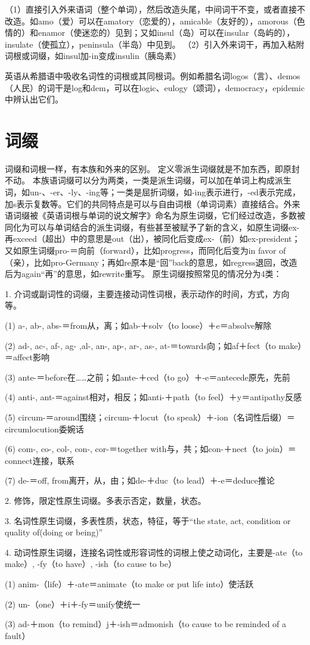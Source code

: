 （1）直接引入外来语词（整个单词），然后改造头尾，中间词干不变，或者直接不改造。如amo（爱）可以在amatory（恋爱的），amicable（友好的），amorous（色情的）和enamor（使迷恋的）见到；又如insul（岛）可以在insular（岛屿的），insulate（使孤立），peninsula（半岛）中见到。
（2）引入外来词干，再加入粘附词根或词缀，如insul加-in变成insulin（胰岛素）

英语从希腊语中吸收名词性的词根或其同根词。例如希腊名词logos（言）、demos（人民）的词干是log和dem，可以在logic、eulogy（颂词），democracy，epidemic中辨认出它们。

\section{词缀}
词缀和词根一样，有本族和外来的区别。 定义零派生词缀就是不加东西，即原封不动。
本族语词缀可以分为两类，一类是派生词缀，可以加在单词上构成派生词，如un-、-er、-ly、-ing等；一类是屈折词缀，如-ing表示进行，-ed表示完成，加s表示复数等。它们的共同特点是可以与自由词根（单词词素）直接结合。外来语词缀被《英语词根与单词的说文解字》命名为原生词缀，它们经过改造，多数被同化为可以与单词结合的派生词缀，有些甚至被赋予了新的含义，如原生词缀ex-再exceed（超出）中的意思是out（出），被同化后变成ex-（前）如ex-president；又如原生词缀pro-＝向前（forward），比如progress，而同化后变为in favor of（亲），比如pro-Germany；再如re原本是“回”back的意思，如regress退回，改造后为again“再”的意思，如rewrite重写。
原生词缀按照常见的情况分为4类：

1.	介词或副词性的词缀，主要连接动词性词根，表示动作的时间，方式，方向等。

(1)	a-, ab-, abs-＝from从，离；如ab-＋solv（to loose）＋e＝absolve解除

(2)	ad-, ac-, af-, ag- ,al-, an-, ap-, ar-, as-, at-＝towards向；如af＋fect（to make）＝affect影响

(3)	ante-＝before在……之前；如ante-＋ced（to go）＋-e＝antecede原先，先前

(4)	anti-, ant-＝against相对，相反；如anti-＋path（to feel）＋y＝antipathy反感

(5) circum-＝around围绕；circum-＋locut（to speak）＋-ion（名词性后缀）＝circumlocution委婉话

(6)	com-, co-, col-, con-, cor-＝together with与，共；如con-＋nect（to join）＝connect连接，联系

(7)	de-＝off, from离开，从，由；如de-＋duc（to lead）＋-e＝deduce推论

2.	修饰，限定性原生词缀。多表示否定，数量，状态。

3.	名词性原生词缀，多表性质，状态，特征，等于“the state, act, condition or quality of(doing or being)”

4.	动词性原生词缀，连接名词性或形容词性的词根上使之动词化，主要是-ate（to make）, -fy（to have）, -ish（to cause to be）

(1)	anim-（life）＋-ate＝animate（to make or put life into）使活跃

(2)	un-（one）＋i＋-fy＝unify使统一

(3)	ad-＋mon（to remind）j＋-ish＝admonish（to cause to be reminded of a fault）

